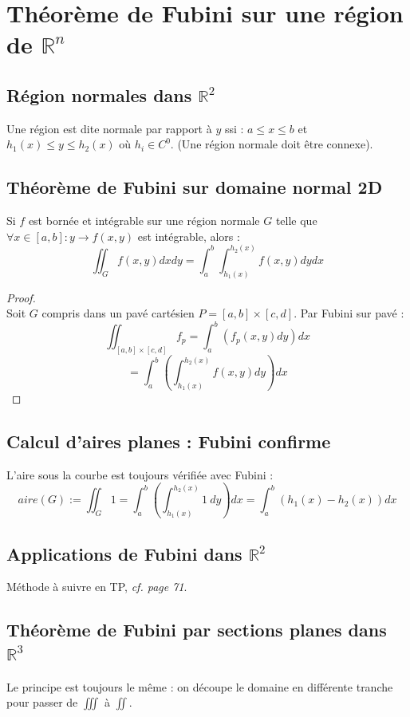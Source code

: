 \documentclass[11pt, a4paper, openany]{book}
\begin{document}
\section{Théorème de Fubini sur une région de $\mathbb{R}^n$}
\subsection{Région normales dans $\mathbb{R}^2$}
Une région est dite normale par rapport à $y$ ssi : $a \leq x \leq b$ et $h_1(x) \leq y \leq h_2(x)$ où $h_i \in C^0$. (Une région normale doit être connexe).

\subsection{Théorème de Fubini sur domaine normal 2D}
Si $f$ est bornée et intégrable sur une région normale $G$ telle que $\forall x \in [a,b] : y \rightarrow f(x,y)$ est intégrable, alors :
$$\iint_G f(x,y) dx dy = \int_a^b\int_{h_1(x)}^{h_2(x)} f(x,y) dy dx$$

\begin{proof}\ \\
	Soit $G$ compris dans un pavé cartésien $P = [a,b] \times [c,d]$. Par Fubini sur pavé : 
	$$\iint_{[a,b]\times [c,d]} f_p = \int_a^b \left( f_p(x,y) dy\right) dx$$
	$$= \int_a^b \left( \int_{h_1(x)}^{h_2(x)} f(x,y) dy \right)dx$$
\end{proof}

\subsection{Calcul d'aires planes : Fubini confirme}
L'aire sous la courbe est toujours vérifiée avec Fubini :
$$aire(G) := \iint_G 1 = \int_a^b \left( \int_{h_1(x)}^{h_2(x)} 1\ dy \right)dx = \int_a^b \left( h_1(x) - h_2(x)\right) dx$$

\subsection{Applications de Fubini dans $\mathbb{R}^2$}
Méthode à suivre en TP, \textit{cf. page 71}.

\subsection{Théorème de Fubini par sections planes dans $\mathbb{R}^3$}
Le principe est toujours le même : on découpe le domaine en différente tranche pour passer de $\iiint$ à $\iint$.
\end{document}
